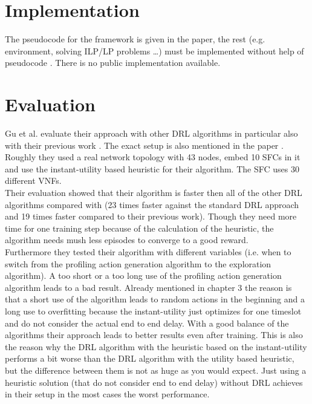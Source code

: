 \section {Implementation}
The pseudocode for the framework is given in the paper, the rest (e.g. environment, solving ILP/LP problems \dots) must be implemented without help of pseudocode \cite{Gu}. There is no public implementation available.


\section{Evaluation}%
\label{sec:evaluation}
Gu et al. \cite{Gu} evaluate their approach with other DRL algorithms in particular also with their previous work \cite{Guz}. The exact setup is also mentioned in the paper \cite{Gu}. Roughly they used a real network topology with 43 nodes, embed 10 SFCs in it and use the instant-utility based heuristic for their algorithm. The SFC uses 30 different VNFs.\\
Their evaluation showed that their algorithm is faster then all of the other DRL algorithms compared with (23 times faster against the standard DRL approach and 19 times faster compared to their previous work). Though they need more time for one training step because of the calculation of the heuristic, the algorithm needs mush less episodes to converge to a good reward.\\
Furthermore they tested their algorithm with different variables (i.e. when to switch from the profiling action generation algorithm to the exploration algorithm). A too short or a too long use of the profiling action generation algorithm leads to a bad result. Already mentioned in chapter 3 %
the reason is that a short use of the algorithm leads to random actions in the beginning and a long use to overfitting because the instant-utility just optimizes for one timeslot and do not consider the actual end to end delay. With a good balance of the algorithms their approach leads to better results even after training. This is also the reason why the DRL algorithm with the heuristic based on the instant-utility performs a bit worse than the DRL algorithm with the utility based heuristic, but the difference between them is not as huge as you would expect. Just using a heuristic solution (that do not consider end to end delay) without DRL achieves in their setup in the most cases the worst performance.




